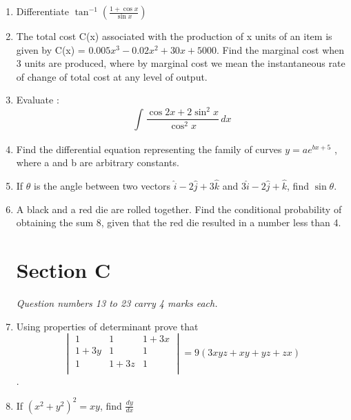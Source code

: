 \documentclass[journal,12pt,twocolumn]{IEEEtran}
\begin{document}
\begin{enumerate}
    \item Differentiate
    $ \tan^{-1}(\frac{1 + \cos x}{\sin x})$
    
    \item The total cost C(x) associated with the production of x units of an item is given by C(x) = 
$ 0.005x^{3} - 0.02x^{2} + 30x + 5000 $. Find the marginal cost when 3 units are produced, where by marginal cost we mean the instantaneous rate of change of total cost at any level of output.

    \item Evaluate : 
    $$ \int_{}^{} \frac{\cos 2x + 2\sin^{2} x}{\cos^{2} x} \,dx $$
    
    \item Find the differential equation representing the family of curves $ y = ae^{bx + 5} $ , where a and b are arbitrary constants.
    
    \item If $\theta$ is the angle between two vectors $\hat{i} - 2\hat{j} + 3\hat{k}$ and $3\hat{i} - 2\hat{j} + \hat{k}$, find $\sin\theta$.
    
    \item A black and a red die are rolled together. Find the conditional probability of obtaining the sum 8, given that the red die resulted in a number less than 4.
    
    \begin{center}
    \section*{Section C}
    \end{center}
    
    \begin{flushleft}
    \textit{Question numbers 13 to 23 carry 4 marks each.}
    \end{flushleft}
    
    \item \noindent Using properties of determinant prove that
     $$\begin{vmatrix}
     1 & 1 & 1 + 3x \\
     1 + 3y & 1 & 1 \\
     1 & 1 + 3z & 1 \\
     \end{vmatrix} 
     = 9(3xyz + xy + yz + zx)$$.
     
     \item If 
     $ (x^{2} + y^{2})^{2} = xy $, find $ \frac{dy}{dx}$
     

\end{enumerate}
\end{document}
